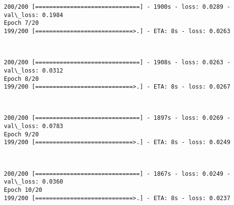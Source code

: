 \documentclass[11pt]{article}
\begin{document}
    \begin{Verbatim}[commandchars=\\\{\}]
200/200 [==============================] - 1900s - loss: 0.0289 - val\_loss: 0.1984
Epoch 7/20
199/200 [============================>.] - ETA: 8s - loss: 0.0263 
    \end{Verbatim}

    \begin{center}
    \end{center}
    { \hspace*{\fill} \\}
    
    \begin{Verbatim}[commandchars=\\\{\}]
200/200 [==============================] - 1908s - loss: 0.0263 - val\_loss: 0.0312
Epoch 8/20
199/200 [============================>.] - ETA: 8s - loss: 0.0267 
    \end{Verbatim}

    \begin{center}
    \end{center}
    { \hspace*{\fill} \\}
    
    \begin{Verbatim}[commandchars=\\\{\}]
200/200 [==============================] - 1897s - loss: 0.0269 - val\_loss: 0.0783
Epoch 9/20
199/200 [============================>.] - ETA: 8s - loss: 0.0249 
    \end{Verbatim}

    \begin{center}
    \end{center}
    { \hspace*{\fill} \\}
    
    \begin{Verbatim}[commandchars=\\\{\}]
200/200 [==============================] - 1867s - loss: 0.0249 - val\_loss: 0.0360
Epoch 10/20
199/200 [============================>.] - ETA: 8s - loss: 0.0237 
    \end{Verbatim}

    \begin{center}
    \end{center}
    { \hspace*{\fill} \\}
    
\end{document}
